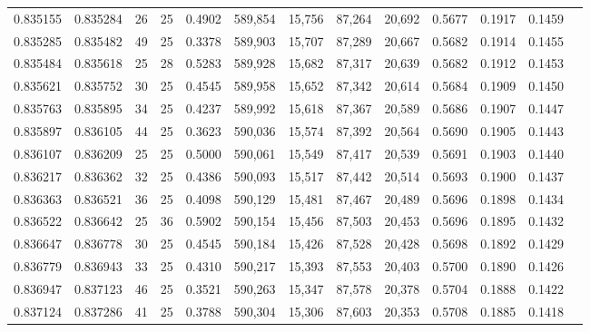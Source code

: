 \begin{tabular}{rrrrrrrrrrrrr}
0.835155 & 0.835284 &    26 &  25 &                                     0.4902 & 589,854 &  15,756 &  87,264 &  20,692 & 0.5677 & 0.1917 & 0.1459 \\
0.835285 & 0.835482 &    49 &  25 &                                     0.3378 & 589,903 &  15,707 &  87,289 &  20,667 & 0.5682 & 0.1914 & 0.1455 \\
0.835484 & 0.835618 &    25 &  28 &                                     0.5283 & 589,928 &  15,682 &  87,317 &  20,639 & 0.5682 & 0.1912 & 0.1453 \\
0.835621 & 0.835752 &    30 &  25 &                                     0.4545 & 589,958 &  15,652 &  87,342 &  20,614 & 0.5684 & 0.1909 & 0.1450 \\
0.835763 & 0.835895 &    34 &  25 &                                     0.4237 & 589,992 &  15,618 &  87,367 &  20,589 & 0.5686 & 0.1907 & 0.1447 \\
0.835897 & 0.836105 &    44 &  25 &                                     0.3623 & 590,036 &  15,574 &  87,392 &  20,564 & 0.5690 & 0.1905 & 0.1443 \\
0.836107 & 0.836209 &    25 &  25 &                                     0.5000 & 590,061 &  15,549 &  87,417 &  20,539 & 0.5691 & 0.1903 & 0.1440 \\
0.836217 & 0.836362 &    32 &  25 &                                     0.4386 & 590,093 &  15,517 &  87,442 &  20,514 & 0.5693 & 0.1900 & 0.1437 \\
0.836363 & 0.836521 &    36 &  25 &                                     0.4098 & 590,129 &  15,481 &  87,467 &  20,489 & 0.5696 & 0.1898 & 0.1434 \\
0.836522 & 0.836642 &    25 &  36 &                                     0.5902 & 590,154 &  15,456 &  87,503 &  20,453 & 0.5696 & 0.1895 & 0.1432 \\
0.836647 & 0.836778 &    30 &  25 &                                     0.4545 & 590,184 &  15,426 &  87,528 &  20,428 & 0.5698 & 0.1892 & 0.1429 \\
0.836779 & 0.836943 &    33 &  25 &                                     0.4310 & 590,217 &  15,393 &  87,553 &  20,403 & 0.5700 & 0.1890 & 0.1426 \\
0.836947 & 0.837123 &    46 &  25 &                                     0.3521 & 590,263 &  15,347 &  87,578 &  20,378 & 0.5704 & 0.1888 & 0.1422 \\
0.837124 & 0.837286 &    41 &  25 &                                     0.3788 & 590,304 &  15,306 &  87,603 &  20,353 & 0.5708 & 0.1885 & 0.1418 \\

\end{tabular}
